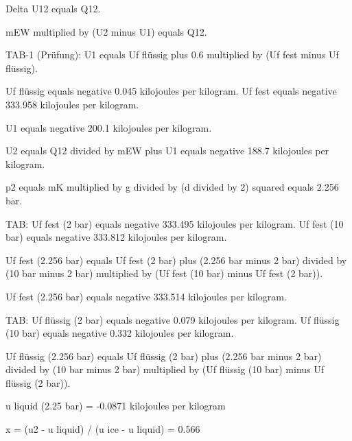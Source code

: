 Delta U12 equals Q12.  

mEW multiplied by (U2 minus U1) equals Q12.  

TAB-1 (Prüfung):  
U1 equals Uf flüssig plus 0.6 multiplied by (Uf fest minus Uf flüssig).  

Uf flüssig equals negative 0.045 kilojoules per kilogram.  
Uf fest equals negative 333.958 kilojoules per kilogram.  

U1 equals negative 200.1 kilojoules per kilogram.  

U2 equals Q12 divided by mEW plus U1 equals negative 188.7 kilojoules per kilogram.  

p2 equals mK multiplied by g divided by (d divided by 2) squared equals 2.256 bar.  

TAB:  
Uf fest (2 bar) equals negative 333.495 kilojoules per kilogram.  
Uf fest (10 bar) equals negative 333.812 kilojoules per kilogram.  

Uf fest (2.256 bar) equals Uf fest (2 bar) plus (2.256 bar minus 2 bar) divided by (10 bar minus 2 bar) multiplied by (Uf fest (10 bar) minus Uf fest (2 bar)).  

Uf fest (2.256 bar) equals negative 333.514 kilojoules per kilogram.  

TAB:  
Uf flüssig (2 bar) equals negative 0.079 kilojoules per kilogram.  
Uf flüssig (10 bar) equals negative 0.332 kilojoules per kilogram.  

Uf flüssig (2.256 bar) equals Uf flüssig (2 bar) plus (2.256 bar minus 2 bar) divided by (10 bar minus 2 bar) multiplied by (Uf flüssig (10 bar) minus Uf flüssig (2 bar)).

u liquid (2.25 bar) = -0.0871 kilojoules per kilogram  

x = (u2 - u liquid) / (u ice - u liquid) = 0.566